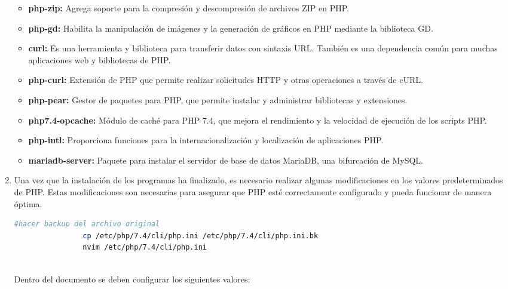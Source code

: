 \begin{enumerate}
\begin{itemize}
					\item \textbf{php-zip:} Agrega soporte para la compresión y descompresión de archivos ZIP en PHP.
					
					\item \textbf{php-gd:} Habilita la manipulación de imágenes y la generación de gráficos en PHP mediante la biblioteca GD.
					
					\item \textbf{curl:} Es una herramienta y biblioteca para transferir datos con sintaxis URL. También es una dependencia común para muchas aplicaciones web y bibliotecas de PHP.
					
					\item \textbf{php-curl:} Extensión de PHP que permite realizar solicitudes HTTP y otras operaciones a través de cURL.
					
					\item \textbf{php-pear:} Gestor de paquetes para PHP, que permite instalar y administrar bibliotecas y extensiones.
					
					\item \textbf{php7.4-opcache:} Módulo de caché para PHP 7.4, que mejora el rendimiento y la velocidad de ejecución de los scripts PHP.
					
					\item \textbf{php-intl:} Proporciona funciones para la internacionalización y localización de aplicaciones PHP.
					
					\item \textbf{mariadb-server:} Paquete para instalar el servidor de base de datos MariaDB, una bifurcación de MySQL.
			
				\end{itemize}
		
				\item Una vez que la instalación de los programas ha finalizado, es necesario realizar algunas modificaciones en los valores predeterminados de PHP. Estas modificaciones son necesarias para asegurar que PHP esté correctamente configurado y pueda funcionar de manera óptima.
				
			
				\begin{lstlisting}[language=Bash,caption=Directorio de trabajo NextCloud]
				#hacer backup del archivo original
				cp /etc/php/7.4/cli/php.ini /etc/php/7.4/cli/php.ini.bk
				nvim /etc/php/7.4/cli/php.ini
				
				\end{lstlisting}
				Dentro del documento se deben configurar los siguientes valores:
						

\end{enumerate}
